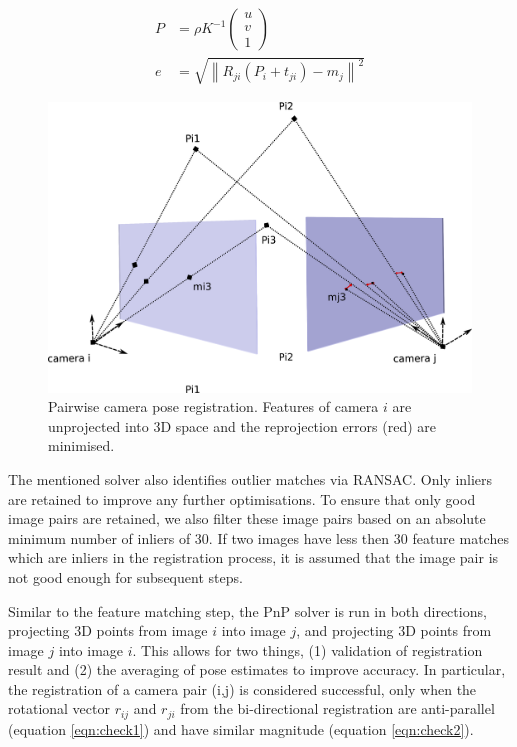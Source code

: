 \documentclass[10pt,twocolumn,letterpaper]{article}
\newcommand{\norm}[1]{\left\lVert #1 \right\rVert}
\begin{document}
\begin{align}
P &= \rho K^{-1} \begin{pmatrix}
u\\v\\1
\end{pmatrix} \label{eqn:backprojection}\\
e &= \sqrt{\norm{R_{ji}\left(P_{i}+t_{ji}\right)-m_{j}}^2} \label{eqn:reprojerror}
\end{align}

\begin{figure}[t]
\begin{center}
   \includegraphics[width=0.9\linewidth]{figures/registration.pdf}
\end{center}
\caption{Pairwise camera pose registration. Features of camera $i$ are unprojected into 3D space and the reprojection errors (red) are minimised.}
\label{fig:reg}
\end{figure}

The mentioned solver also identifies outlier matches via RANSAC. Only inliers
are retained to improve any further optimisations. To ensure that only good
image pairs are retained, we also filter these image pairs based on an absolute
minimum number of inliers of 30. If two images have less then 30 feature matches
which are inliers in the registration process, it is assumed that the image pair
is not good enough for subsequent steps.

Similar to the feature matching step, the PnP solver is run in both directions,
projecting 3D points from image $i$ into image $j$, and projecting 3D points
from image $j$ into image $i$. This allows for two things, (1) validation of registration result and (2) the averaging of
pose estimates to improve accuracy. In particular, the registration of a camera pair (i,j) is considered successful, only when the rotational vector $r_{ij}$ and $r_{ji}$ from the bi-directional registration are anti-parallel (equation \ref{eqn:check1}) and have similar magnitude (equation \ref{eqn:check2}).
\end{document}
